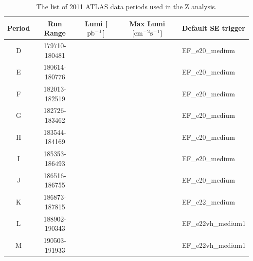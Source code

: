 \begin{table}
\centering
\begin{tabular}{ c | cccl } \hline\hline
Period & Run Range & Lumi [$\rm pb^{-1}$] & Max Lumi $\rm [cm^{-2}s^{-1}]$ & Default SE trigger \\ \hline
D & 179710-180481 & & & EF\_e20\_medium \\
E & 180614-180776 & & & EF\_e20\_medium \\
F & 182013-182519 & & & EF\_e20\_medium \\
G & 182726-183462 & & & EF\_e20\_medium \\
H & 183544-184169 & & & EF\_e20\_medium \\
I & 185353-186493 & & & EF\_e20\_medium \\
J & 186516-186755 & & & EF\_e20\_medium \\
K & 186873-187815 & & & EF\_e22\_medium \\
L & 188902-190343 & & & EF\_e22vh\_medium1 \\
M & 190503-191933 & & & EF\_e22vh\_medium1 \\
\hline
\end{tabular}
\caption{The list of 2011 ATLAS data periods used in the Z analysis. \tbu}
\label{tab:data}
\end{table}
